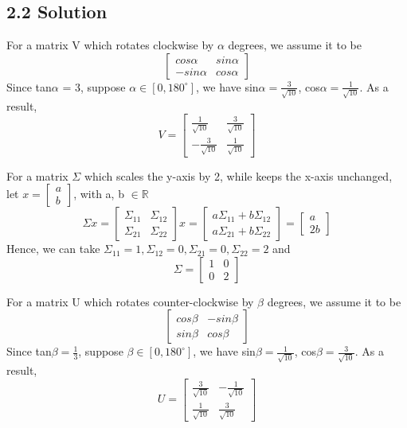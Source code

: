 \documentclass{article}
\begin{document}
\subsection*{2.2 Solution}
For a matrix V which rotates clockwise by $\alpha$ degrees, we assume it to be
\[
\begin{bmatrix} cos \alpha & sin \alpha \\ -sin \alpha & cos \alpha \end{bmatrix} 
\]
Since tan$\alpha$ = 3, suppose $\alpha \in [0,180^\circ]$, we have sin$\alpha = \frac{3}{\sqrt{10}}$, cos$\alpha = \frac{1}{\sqrt{10}}$. As a result, 
\[
V = \begin{bmatrix} \frac{1}{\sqrt{10}} & \frac{3}{\sqrt{10}} \\ -\frac{3}{\sqrt{10}} & \frac{1}{\sqrt{10}} \end{bmatrix} 
\]

For a matrix $\Sigma$ which scales the y-axis by 2, while keeps the x-axis unchanged, let $x = \begin{bmatrix} a \\ b \end{bmatrix}$, with a, b $\in \mathbb{R}$
\[
    \Sigma x = \begin{bmatrix} \Sigma_{11} & \Sigma_{12} \\ \Sigma_{21} & \Sigma_{22} \end{bmatrix} x = \begin{bmatrix} a \Sigma_{11} + b \Sigma_{12} \\ a \Sigma_{21} + b \Sigma_{22} \end{bmatrix} = \begin{bmatrix} a \\ 2b\end{bmatrix}
\]
Hence, we can take $\Sigma_{11} = 1, \Sigma_{12} = 0, \Sigma_{21} = 0, \Sigma_{22} = 2$ and 
\[
\Sigma = \begin{bmatrix} 1 & 0 \\ 0 & 2 \end{bmatrix} 
\]

For a matrix U which rotates counter-clockwise by $\beta$ degrees, we assume it to be
\[
\begin{bmatrix} cos \beta & -sin \beta \\ sin \beta & cos \beta \end{bmatrix} 
\]
Since tan$\beta = \frac{1}{3}$, suppose $\beta \in [0,180^\circ]$, we have sin$\beta = \frac{1}{\sqrt{10}}$, cos$\beta = \frac{3}{\sqrt{10}}$. As a result, 
\[
U = \begin{bmatrix} \frac{3}{\sqrt{10}} & -\frac{1}{\sqrt{10}} \\ \frac{1}{\sqrt{10}} & \frac{3}{\sqrt{10}} \end{bmatrix} 
\]
\end{document}
